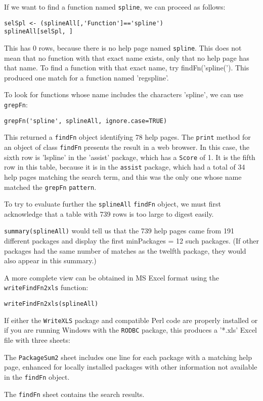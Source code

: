 If we want to find a function named {\tt spline}, we can
proceed as follows:
\begin{verbatim}
selSpl <- (splineAll[,'Function']=='spline')
splineAll[selSpl, ]
\end{verbatim}
This has 0 rows, because there is no help page named
{\tt spline}.  This does not mean that no function
with that exact name exists, only that no help page
has that name.  To find a function with that exact
name, try {findFn('spline(')}.  This produced one match
for a function named 'regspline'.

To look for functions whose name includes the characters 'spline',
we can use {\tt grepFn}:
\begin{verbatim}
grepFn('spline', splineAll, ignore.case=TRUE)
\end{verbatim}
This returned a {\tt findFn} object identifying 78 help pages.
The {\tt print} method for an object of class {\tt findFn}
presents the result in a web browser.  In this case,
the sixth row is 'lspline' in the
'assist' package, which has a {\tt Score} of 1.  It
is the fifth row in this table, because it is in the
{\tt assist} package, which had a total of 34 help
pages matching the search term, and this was the only
one whose name matched the {\tt grepFn} {\tt pattern}.

To try to evaluate further the {\tt splineAll} {\tt findFn}
object, we must first acknowledge that a table with 739 rows
is too large to digest easily.

{\tt summary(splineAll)} would tell us that the 739 help pages
came from 191 different packages and display the first
minPackages = 12 such packages.  (If other packages had the same number of
matches as the twelfth package, they would also appear in this
summary.)

A more complete view can be obtained in MS Excel format
using the {\tt writeFindFn2xls} function:
\begin{verbatim}
writeFindFn2xls(splineAll)
\end{verbatim}
If either the {\tt WriteXLS} package and compatible Perl code
are properly installed or if you are running Windows with
the {\tt RODBC} package, this produces a '*.xls' Excel file
with three sheets:

The {\tt PackageSum2} sheet includes one line for each 
package with a matching help page, enhanced for locally 
installed packages with other 
information not available in the {\tt findFn} object.  

The {\tt findFn} sheet contains the search results.

